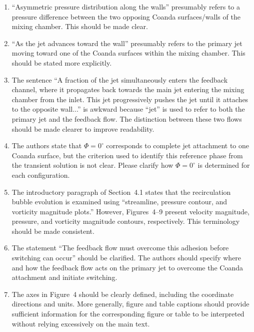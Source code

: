 \documentclass[11pt]{article}
\begin{document}
	\begin{enumerate}
		
		\item ``Asymmetric pressure distribution along the walls'' presumably refers to a pressure difference between the two opposing Coanda surfaces/walls of the mixing chamber. This should be made clear.
		
		\item ``As the jet advances toward the wall'' presumably refers to the primary jet moving toward one of the Coanda surfaces within the mixing chamber. This should be stated more explicitly.
		
		\item The sentence ``A fraction of the jet simultaneously enters the feedback channel, where it propagates back towards the main jet entering the mixing chamber from the inlet. This jet progressively pushes the jet until it attaches to the opposite wall...'' is awkward because ``jet'' is used to refer to both the primary jet and the feedback flow. The distinction between these two flows should be made clearer to improve readability.
		
		\item The authors state that $\Phi=0^\circ$ corresponds to complete jet attachment to one Coanda surface, but the criterion used to identify this reference phase from the transient solution is not clear. Please clarify how $\Phi=0^\circ$ is determined for each configuration.
		
		\item The introductory paragraph of Section~4.1 states that the recirculation bubble evolution is examined using ``streamline, pressure contour, and vorticity magnitude plots.'' However, Figures~4--9 present velocity magnitude, pressure, and vorticity magnitude contours, respectively. This terminology should be made consistent.
		
		\item The statement ``The feedback flow must overcome this adhesion before switching can occur'' should be clarified. The authors should specify where and how the feedback flow acts on the primary jet to overcome the Coanda attachment and initiate switching.
		
		\item The axes in Figure~4 should be clearly defined, including the coordinate directions and units. More generally, figure and table captions should provide sufficient information for the corresponding figure or table to be interpreted without relying excessively on the main text.
		

\end{enumerate}
\end{document}
